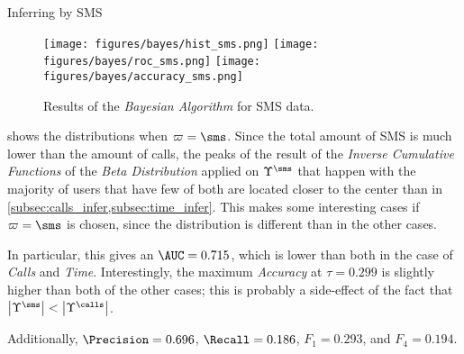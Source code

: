 \documentclass{beamer}
\begin{document}
\begin{frame}{Inferring by SMS}

	\begin{figure}[h]
		\centering
		\texttt{[image: figures/bayes/hist\_sms.png]}
		\texttt{[image: figures/bayes/roc\_sms.png]}
		\texttt{[image: figures/bayes/accuracy\_sms.png]}
		\caption{Results of the \emph{Bayesian Algorithm} for SMS data.}
	\end{figure}

	 shows the distributions when $\varpi = \sms$. Since the total amount of SMS is much lower than the amount of calls, the peaks of the result of the \emph{Inverse Cumulative Functions} of the \emph{Beta Distribution} applied on $\Upsilon^{\sms}$ that happen with the majority of users that have few of both are located closer to the center than in \cref{subsec:calls_infer,subsec:time_infer}. This makes some interesting cases if $\varpi = \sms$ is chosen, since the distribution is different than in the other cases.

	In particular, this gives an $\AUC = 0.715$, which is lower than both in the case of \emph{Calls} and \emph{Time}. Interestingly, the maximum \emph{Accuracy} at $\tau = 0.299$ is slightly higher than both of the other cases; this is probably a side-effect of the fact that $\left| \Upsilon^{\sms} \right| < \left| \Upsilon^{\calls} \right|$.

	Additionally, $\Precision = 0.696$, $\Recall = 0.186$, $F_1 = 0.293$, and $F_4 = 0.194$.

\end{frame}
\end{document}
